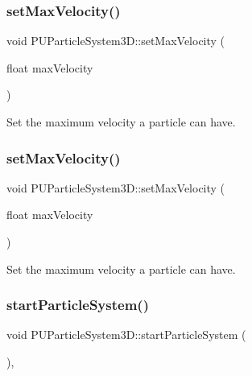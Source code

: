 \subsubsection{\texorpdfstring{set\+Max\+Velocity()}{setMaxVelocity()}\hspace{0.1cm}{\footnotesize\ttfamily [1/2]}}
{\footnotesize\ttfamily void P\+U\+Particle\+System3\+D\+::set\+Max\+Velocity (\begin{DoxyParamCaption}\item[{float}]{max\+Velocity }\end{DoxyParamCaption})}

Set the maximum velocity a particle can have. \mbox{\label{classPUParticleSystem3D_aa3c122c37511ee36d79854cf6c488022}} 
\subsubsection{\texorpdfstring{set\+Max\+Velocity()}{setMaxVelocity()}\hspace{0.1cm}{\footnotesize\ttfamily [2/2]}}
{\footnotesize\ttfamily void P\+U\+Particle\+System3\+D\+::set\+Max\+Velocity (\begin{DoxyParamCaption}\item[{float}]{max\+Velocity }\end{DoxyParamCaption})}

Set the maximum velocity a particle can have. \mbox{\label{classPUParticleSystem3D_ac3ea37e1b73f622a72d7f2576118a551}} 
\subsubsection{\texorpdfstring{start\+Particle\+System()}{startParticleSystem()}\hspace{0.1cm}{\footnotesize\ttfamily [1/2]}}
{\footnotesize\ttfamily void P\+U\+Particle\+System3\+D\+::start\+Particle\+System (\begin{DoxyParamCaption}{ }\end{DoxyParamCaption})\hspace{0.3cm}{\ttfamily [override]}, {\ttfamily [virtual]}}

